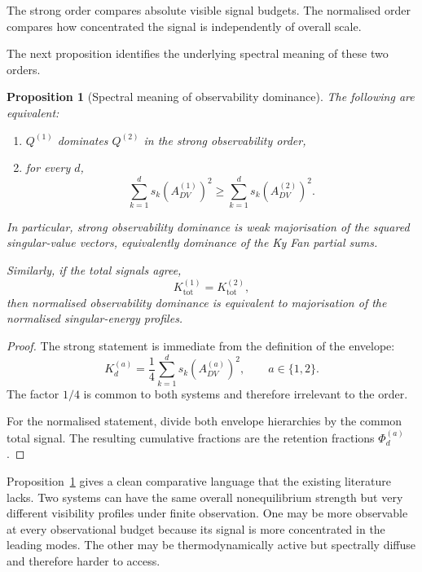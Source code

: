 \documentclass[11pt,a4paper]{article}
\numberwithin{equation}{section}
\theoremstyle{thmcompact}
\newtheorem{proposition}[theorem]{Proposition}
\theoremstyle{remark}
\begin{document}
The strong order compares absolute visible signal budgets. The normalised order compares how concentrated the signal is independently of overall scale.

The next proposition identifies the underlying spectral meaning of these two orders.

\begin{proposition}[Spectral meaning of observability dominance]
\label{prop:spectral_meaning_observability_dominance}
The following are equivalent:
\begin{enumerate}
\item \(Q^{(1)}\) dominates \(Q^{(2)}\) in the strong observability order,
\item for every \(d\),
\begin{equation}
\sum_{k=1}^{d}s_k(A_{DV}^{(1)})^2
\ge
\sum_{k=1}^{d}s_k(A_{DV}^{(2)})^2.
\end{equation}
\end{enumerate}
In particular, strong observability dominance is weak majorisation of the squared singular-value vectors, equivalently dominance of the Ky Fan partial sums.

Similarly, if the total signals agree,
\begin{equation}
K_{\mathrm{tot}}^{(1)}=K_{\mathrm{tot}}^{(2)},
\end{equation}
then normalised observability dominance is equivalent to majorisation of the normalised singular-energy profiles.
\end{proposition}

\begin{proof}
The strong statement is immediate from the definition of the envelope:
\begin{equation}
K_d^{(a)}
=
\frac14\sum_{k=1}^{d}s_k(A_{DV}^{(a)})^2,
\qquad a\in\{1,2\}.
\end{equation}
The factor \(1/4\) is common to both systems and therefore irrelevant to the order.

For the normalised statement, divide both envelope hierarchies by the common total signal. The resulting cumulative fractions are the retention fractions \(\Phi_d^{(a)}\).
\end{proof}

Proposition~\ref{prop:spectral_meaning_observability_dominance} gives a clean comparative language that the existing literature lacks. Two systems can have the same overall nonequilibrium strength but very different visibility profiles under finite observation. One may be more observable at every observational budget because its signal is more concentrated in the leading modes. The other may be thermodynamically active but spectrally diffuse and therefore harder to access.
\end{document}
